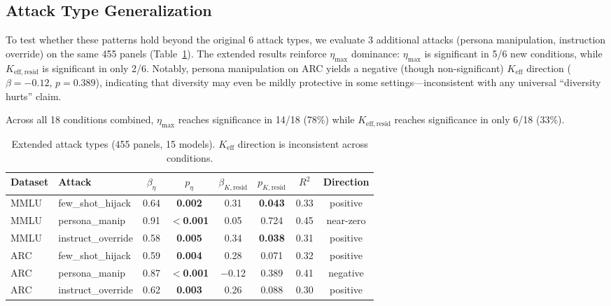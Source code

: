 \documentclass[11pt,a4paper]{article}
\begin{document}
\subsection{Attack Type Generalization}
\label{sec:attack_expand}

To test whether these patterns hold beyond the original 6 attack types, we evaluate 3 additional attacks (persona manipulation, instruction override) on the same 455 panels (Table~\ref{tab:new_attacks}).
The extended results reinforce $\eta_{\max}$ dominance: $\eta_{\max}$ is significant in 5/6 new conditions, while $K_{\mathrm{eff,resid}}$ is significant in only 2/6.
Notably, persona manipulation on ARC yields a negative (though non-significant) $K_{\mathrm{eff}}$ direction ($\beta = -0.12$, $p = 0.389$), indicating that diversity may even be mildly protective in some settings---inconsistent with any universal ``diversity hurts'' claim.

Across all 18 conditions combined, $\eta_{\max}$ reaches significance in 14/18 (78\%) while $K_{\mathrm{eff,resid}}$ reaches significance in only 6/18 (33\%).

\begin{table}[t]
\centering
\caption{Extended attack types (455 panels, 15 models). $K_{\mathrm{eff}}$ direction is inconsistent across conditions.}
\label{tab:new_attacks}
\small
\begin{adjustbox}{max width=\textwidth}
\begin{tabular}{llcccccc}
\toprule
\textbf{Dataset} & \textbf{Attack} & $\beta_{\eta}$ & $p_{\eta}$ & $\beta_{K,\mathrm{resid}}$ & $p_{K,\mathrm{resid}}$ & $R^2$ & \textbf{Direction} \\
\midrule
MMLU & few\_shot\_hijack & 0.64 & \textbf{0.002} & 0.31 & \textbf{0.043} & 0.33 & positive \\
MMLU & persona\_manip & 0.91 & \textbf{$<$0.001} & 0.05 & 0.724 & 0.45 & near-zero \\
MMLU & instruct\_override & 0.58 & \textbf{0.005} & 0.34 & \textbf{0.038} & 0.31 & positive \\
ARC & few\_shot\_hijack & 0.59 & \textbf{0.004} & 0.28 & 0.071 & 0.32 & positive \\
ARC & persona\_manip & 0.87 & \textbf{$<$0.001} & $-$0.12 & 0.389 & 0.41 & negative \\
ARC & instruct\_override & 0.62 & \textbf{0.003} & 0.26 & 0.088 & 0.30 & positive \\
\bottomrule
\end{tabular}
\end{adjustbox}
\end{table}
\end{document}
